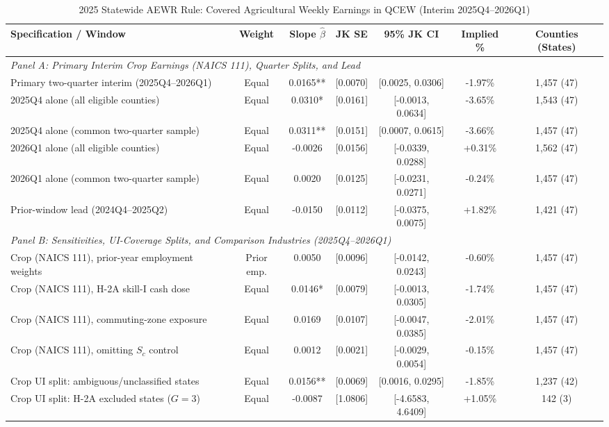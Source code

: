 \begin{table}[!htbp]
\centering
\caption{2025 Statewide AEWR Rule: Covered Agricultural Weekly Earnings in QCEW (Interim 2025Q4--2026Q1)}
\label{tab:policy_2025_earnings}
\small
\begin{tabular}{lcccccc}
\toprule
Specification / Window & Weight & Slope $\hat{\beta}$ & JK SE & 95\% JK CI & Implied \% & Counties (States) \\
\midrule
\multicolumn{7}{l}{\textit{Panel A: Primary Interim Crop Earnings (NAICS 111), Quarter Splits, and Lead}} \\
Primary two-quarter interim (2025Q4--2026Q1) & Equal & 0.0165** & [0.0070] & [0.0025, 0.0306] & -1.97\% & 1,457 (47) \\
2025Q4 alone (all eligible counties) & Equal & 0.0310* & [0.0161] & [-0.0013, 0.0634] & -3.65\% & 1,543 (47) \\
2025Q4 alone (common two-quarter sample) & Equal & 0.0311** & [0.0151] & [0.0007, 0.0615] & -3.66\% & 1,457 (47) \\
2026Q1 alone (all eligible counties) & Equal & -0.0026 & [0.0156] & [-0.0339, 0.0288] & +0.31\% & 1,562 (47) \\
2026Q1 alone (common two-quarter sample) & Equal & 0.0020 & [0.0125] & [-0.0231, 0.0271] & -0.24\% & 1,457 (47) \\
Prior-window lead (2024Q4--2025Q2) & Equal & -0.0150 & [0.0112] & [-0.0375, 0.0075] & +1.82\% & 1,421 (47) \\
\midrule
\multicolumn{7}{l}{\textit{Panel B: Sensitivities, UI-Coverage Splits, and Comparison Industries (2025Q4--2026Q1)}} \\
Crop (NAICS 111), prior-year employment weights & Prior emp. & 0.0050 & [0.0096] & [-0.0142, 0.0243] & -0.60\% & 1,457 (47) \\
Crop (NAICS 111), H-2A skill-I cash dose & Equal & 0.0146* & [0.0079] & [-0.0013, 0.0305] & -1.74\% & 1,457 (47) \\
Crop (NAICS 111), commuting-zone exposure & Equal & 0.0169 & [0.0107] & [-0.0047, 0.0385] & -2.01\% & 1,457 (47) \\
Crop (NAICS 111), omitting $S_c$ control & Equal & 0.0012 & [0.0021] & [-0.0029, 0.0054] & -0.15\% & 1,457 (47) \\
Crop UI split: ambiguous/unclassified states & Equal & 0.0156** & [0.0069] & [0.0016, 0.0295] & -1.85\% & 1,237 (42) \\
Crop UI split: H-2A excluded states ($G=3$) & Equal & -0.0087 & [1.0806] & [-4.6583, 4.6409] & +1.05\% & 142 (3) \\

\end{tabular}
\end{table}
